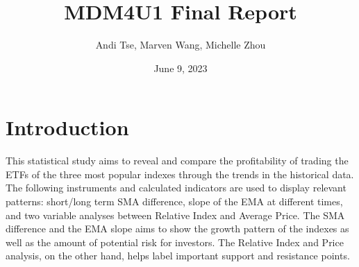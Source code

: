 \documentclass{article}
\title{MDM4U1 Final Report}
\author{Andi Tse, Marven Wang, Michelle Zhou}
\date{June 9, 2023}
\begin{document}
\maketitle
\tableofcontents
\newpage



















\section{Introduction}
	This statistical study aims to reveal and compare the profitability of trading the ETFs of the three most popular indexes through the trends in the historical data. The following instruments and calculated indicators are used to display relevant patterns: short/long term SMA difference, slope of the EMA at different times, and two variable analyses between Relative Index and Average Price. The SMA difference and the EMA slope aims to show the growth pattern of the indexes as well as the amount of potential risk for investors. The Relative Index and Price analysis, on the other hand, helps label important support and resistance points. 
\end{document}
